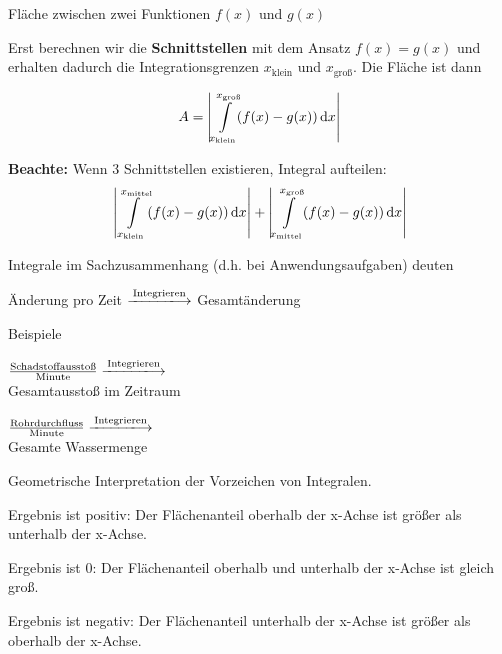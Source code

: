 \documentclass[paper=a6,ngerman,twoside=true,fontsize=14pt, parskip = half]{scrartcl}
\begin{document}
\begin{frage}
	Fläche zwischen zwei Funktionen $f(x)$ und $g(x)$
\end{frage}
\begin{antwort}
			Erst berechnen wir die \textbf{Schnittstellen} mit dem Ansatz $f(x)=g(x)$
			und erhalten dadurch die Integrationsgrenzen $x_{\text{klein}}$ und $x_{\text{groß}}$.
			Die Fläche ist dann
	
			
				\[A=\left|\displaystyle\int\limits_{x_{\text{klein}}}^{x_{\text{groß}}} \! (f(x)-g(x)) \, \mathrm{d}x\right|\]
			
			\textbf{Beachte:} Wenn 3 Schnittstellen existieren, Integral aufteilen:
			\small
			\begin{equation*}
				\left|\displaystyle\int\limits_{x_{\text{klein}}}^{x_{\text{mittel}}} \! (f(x)-g(x)) \, \mathrm{d}x\right|
				+\left|\displaystyle\int\limits_{x_{\text{mittel}}}^{x_{\text{groß}}} \! (f(x)-g(x)) \, \mathrm{d}x\right|
			\end{equation*}
		
\end{antwort}
\begin{frage}
	Integrale im Sachzusammenhang (d.h. bei Anwendungsaufgaben) deuten
\end{frage}
\begin{antwort}
	Änderung pro Zeit $\xlongrightarrow{\text{Integrieren}}$ Gesamtänderung 
	
	\bigskip Beispiele
	
	\bigskip
	$\frac{\text{Schadstoffausstoß}}{\text{Minute}} \xlongrightarrow{\text{Integrieren}}$ \\ Gesamtausstoß im Zeitraum
	
	\vspace{0.5cm}
	
	$\frac{\text{Rohrdurchfluss}}{\text{Minute}} \xlongrightarrow{\text{Integrieren}}$ \\ Gesamte Wassermenge
\end{antwort}
\begin{frage}
	Geometrische Interpretation der Vorzeichen von Integralen.
\end{frage}
\begin{antwort}
		Ergebnis ist positiv: Der Flächenanteil oberhalb der x-Achse ist größer als unterhalb der x-Achse.

		Ergebnis ist 0: Der Flächenanteil oberhalb und unterhalb der x-Achse ist gleich groß.

		Ergebnis ist negativ: Der Flächenanteil unterhalb der x-Achse ist größer als oberhalb der x-Achse.
\end{antwort}
\end{document}
